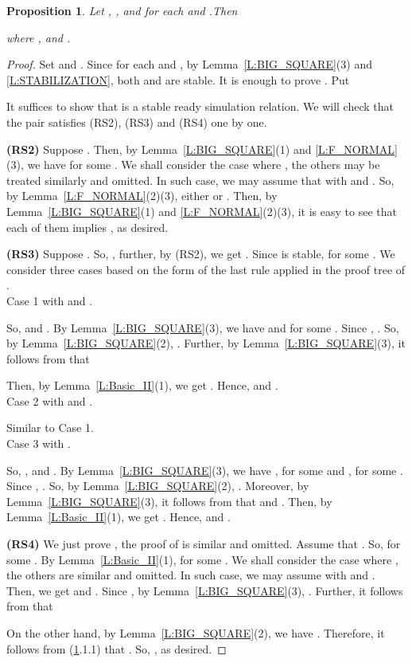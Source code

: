 \documentclass{elsarticle}
\theoremstyle{plain}
\newtheorem{proposition}[theorem]{Proposition}
\theoremstyle{definition}
\begin{document}
\begin{proposition}\label{L:MULTIPLE_I}
Let , ,  and
 for each  and .Then

where
,
 and
.
\end{proposition}
\begin{proof}
  Set  and .
  Since  for each  and , by Lemma~\ref{L:BIG_SQUARE}(3) and \ref{L:STABILIZATION}, both  and  are stable.
  It is enough to prove . Put
  
  It suffices to show that  is a stable ready simulation relation. We will check that the pair  satisfies (RS2), (RS3) and (RS4) one by one.

  \textbf{(RS2)} Suppose .
  Then, by Lemma~\ref{L:BIG_SQUARE}(1) and \ref{L:F_NORMAL}(3), we have  for some .
  We shall consider the case where , the others may be treated similarly and omitted.
  In such case, we may assume that  with  and .
So, by Lemma~\ref{L:F_NORMAL}(2)(3), either  or .
  Then, by Lemma~\ref{L:BIG_SQUARE}(1) and \ref{L:F_NORMAL}(2)(3), it is easy to see that each of them implies   , as desired.

  \textbf{(RS3)} Suppose .
  So, , further, by (RS2), we get .
  Since  is stable,  for some .
  We consider three cases based on the form of the last rule applied in the proof tree of  .\\

\noindent  Case 1  with  and .

  So,  and .
  By Lemma~\ref{L:BIG_SQUARE}(3), we have  and  for some .
  Since , .
  So, by Lemma~\ref{L:BIG_SQUARE}(2), .
  Further, by Lemma~\ref{L:BIG_SQUARE}(3), it follows from  that
  
  Then, by Lemma~\ref{L:Basic_II}(1), we get  .
  Hence,  and .\\

\noindent  Case 2  with  and .

  Similar to Case 1.\\


\noindent  Case 3  with .

  So, ,  and .
  By Lemma~\ref{L:BIG_SQUARE}(3), we have ,  for some  and ,  for some .
  Since , .
  So, by Lemma~\ref{L:BIG_SQUARE}(2), .
  Moreover, by Lemma~\ref{L:BIG_SQUARE}(3), it follows from  that  and . Then, by Lemma~\ref{L:Basic_II}(1), we get  .
  Hence,  and .

  \textbf{(RS4)} We just prove , the proof of  is similar and omitted.
   Assume that .
   So,  for some .
   By Lemma~\ref{L:Basic_II}(1),  for some .
     We shall consider the case where , the others are similar and omitted.
     In such case, we may assume  with  and .
     Then, we get  and .
   Since , by Lemma~\ref{L:BIG_SQUARE}(3), .
   Further, it follows from  that
   
   On the other hand, by Lemma~\ref{L:BIG_SQUARE}(2), we have .
    Therefore, it follows from (\ref{L:MULTIPLE_I}.1.1) that .
    So, , as desired.
\end{proof}
\end{document}
